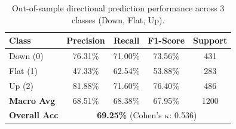 \begin{table}[htbp]
\centering
\caption{Out-of-sample directional prediction performance across 3 classes (Down, Flat, Up).}
\label{tab:direction_confusion}
\begin{tabular}{lcccc}
\toprule
\textbf{Class} & \textbf{Precision} & \textbf{Recall} & \textbf{F1-Score} & \textbf{Support} \\
\midrule
Down (0)        &  76.31\% &  71.00\% &  73.56\% &     431 \\
Flat (1)        &  47.33\% &  62.54\% &  53.88\% &     283 \\
Up (2)          &  81.88\% &  71.60\% &  76.40\% &     486 \\
\midrule
\textbf{Macro Avg}   &  68.51\% &  68.38\% &  67.95\% &    1200 \\
\textbf{Overall Acc} & \multicolumn{4}{c}{\textbf{69.25\%} (Cohen's $\kappa$: 0.536)} \\
\bottomrule
\end{tabular}
\end{table}